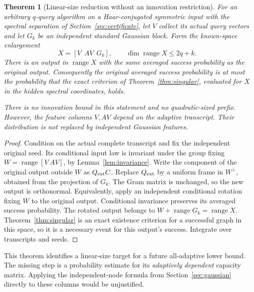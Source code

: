 \documentclass[11pt]{article}
\newtheorem{theorem}{Theorem}[section]
\theoremstyle{definition}
\newcommand{\ran}{\operatorname{range}}
\begin{document}
\begin{theorem}[Linear-size reduction without an innovation restriction]\label{thm:linear}
For an arbitrary $q$-query algorithm on a Haar-conjugated symmetric input with the spectral separation of Section~\ref{sec:certificate}, let $V$ collect its actual query vectors and let $G_k$ be an independent standard Gaussian block. Form the known-space enlargement
\[
 X=[V\ \ AV\ \ G_k],\qquad \dim\ran X\le2q+k.
\]
There is an output in $\ran X$ with the same averaged success probability as the original output. Consequently the original averaged success probability is at most the probability that the exact criterion of Theorem~\ref{thm:singular}, evaluated for $X$ in the hidden spectral coordinates, holds.

There is no innovation bound in this statement and no quadratic-sized prefix. However, the feature columns $V,AV$ depend on the adaptive transcript. Their distribution is not replaced by independent Gaussian features.
\end{theorem}
\begin{proof}
Condition on the actual complete transcript and fix the independent original seed. Its conditional input law is invariant under the group fixing $W=\ran[V\ AV]$, by Lemma~\ref{lem:invariance}. Write the component of the original output outside $W$ as $Q_{\rm ext}C$. Replace $Q_{\rm ext}$ by a uniform frame in $W^\perp$, obtained from the projection of $G_k$. The Gram matrix is unchanged, so the new output is orthonormal. Equivalently, apply an independent conditional rotation fixing $W$ to the original output. Conditional invariance preserves its averaged success probability. The rotated output belongs to $W+\ran G_k=\ran X$. Theorem~\ref{thm:singular} is an exact existence criterion for a successful graph in this space, so it is a necessary event for this output's success. Integrate over transcripts and seeds.
\end{proof}

This theorem identifies a linear-size target for a future all-adaptive lower bound. The missing step is a probability estimate for its \emph{adaptively dependent} capacity matrix. Applying the independent-node formula from Section~\ref{sec:gaussian} directly to these columns would be unjustified.
\end{document}
